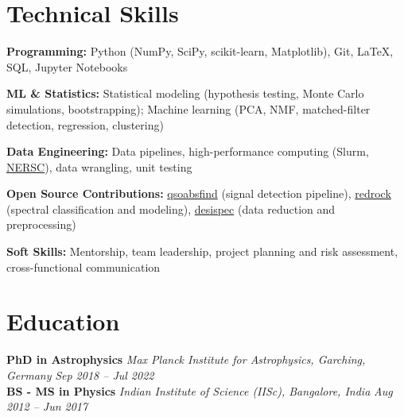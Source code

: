 \documentclass[a4paper,10pt]{article}
\begin{document}
\section*{Technical Skills}

\textcolor{sectionblue}{\textbf{Programming:}} 
Python (NumPy, SciPy, scikit-learn, Matplotlib), Git, LaTeX, SQL, Jupyter Notebooks

\textcolor{sectionblue}{\textbf{ML \& Statistics:}} 
Statistical modeling (hypothesis testing, Monte Carlo simulations, bootstrapping); 
Machine learning (PCA, NMF, matched-filter detection, regression, clustering)

\textcolor{sectionblue}{\textbf{Data Engineering:}} 
Data pipelines, high-performance computing (Slurm, \href{https://www.nersc.gov}{NERSC}), data wrangling, unit testing

\textcolor{sectionblue}{\textbf{Open Source Contributions:}} 
\href{https://github.com/abhi0395/qsoabsfind}{qsoabsfind} (signal detection pipeline), 
\href{https://github.com/desihub/redrock}{redrock} (spectral classification and modeling), 
\href{https://github.com/desihub/desispec}{desispec} (data reduction and preprocessing)

\textcolor{sectionblue}{\textbf{Soft Skills:}} 
Mentorship, team leadership, project planning and risk assessment, cross-functional communication


\vspace*{-2mm}

\section*{Education}

\textcolor{sectionblue}{\textbf{PhD in Astrophysics}} \hfill \textit{Max Planck Institute for Astrophysics, Garching, Germany} \hfill \textit{Sep 2018 – Jul 2022}\\
\textcolor{sectionblue}{\textbf{BS - MS in Physics}} \hfill \textit{Indian Institute of Science (IISc), Bangalore, India} \hfill \textit{Aug 2012 – Jun 2017}
\end{document}
